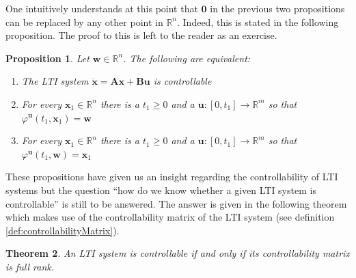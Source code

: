 \documentclass[a4paper,10pt,oneside]{book}
\newtheorem{theorem}{Theorem}
\newtheorem{proposition}[theorem]{Proposition}
\begin{document}
One intuitively understands at this point that $\mathbf{0}$ in the previous two propositions can be replaced by any other point in $\mathbb{R}^n$. Indeed, this is stated in the following proposition. The proof to this is left to the reader as an exercise.
\begin{proposition}
 Let $\mathbf{w}\in\mathbb{R}^n$. The following are equivalent:
\begin{enumerate}
 \item The LTI system $\dot{\mathbf{x}}=\mathbf{Ax}+\mathbf{Bu}$ is controllable
 \item For every $\mathbf{x}_1\in\mathbb{R}^n$ there is a $t_1\geq 0$ and a $\mathbf{u}:[0,t_1]\to \mathbb{R}^m$ so that $\varphi^{\mathbf{u}}(t_1,\mathbf{x}_1)=\mathbf{w}$
 \item For every $\mathbf{x}_1\in\mathbb{R}^n$ there is a $t_1\geq 0$ and a $\mathbf{u}:[0,t_1]\to \mathbb{R}^m$ so that $\varphi^{\mathbf{u}}(t_1,\mathbf{w})=\mathbf{x}_1$
\end{enumerate}
\end{proposition}
These propositions have given us an insight regarding the controllability of LTI systems but the question ``how do we know whether a given LTI system is controllable'' is still to be answered. The answer is given in the following theorem which makes use of the controllability matrix of the LTI system (see definition \ref{def:controllabilityMatrix}).
\begin{theorem}\label{thm:controllability}
 An LTI system is controllable if and only if its controllability matrix is full rank.
\end{theorem}
\end{document}
